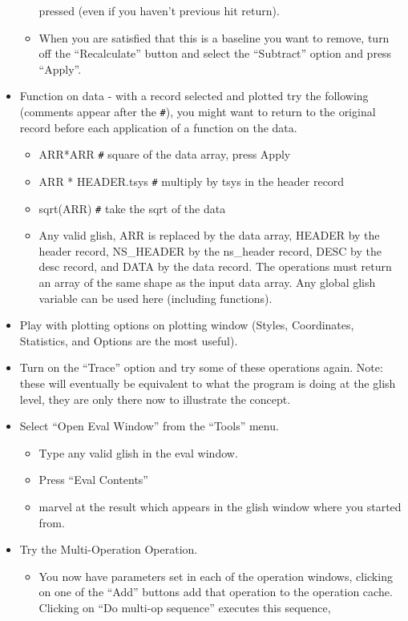\begin{itemize}
\begin{itemize}
pressed (even if you haven't previous hit return).
\item When you are satisfied that this is a baseline you want to remove,
turn off the ``Recalculate'' button and select the ``Subtract'' option
and press ``Apply''.
\end{itemize}
\item Function on data - with a record selected and plotted try the following
(comments appear after the \verb_#_), you might want to return to the original
record before each application of a function on the data.
\begin{itemize}
\item ARR*ARR  \verb_#_ square of the data array, press Apply
\item ARR * HEADER.tsys  \verb_#_ multiply by tsys in the header record
\item sqrt(ARR) \verb_#_ take the sqrt of the data
\item Any valid glish, ARR is replaced by the data array, HEADER by
the header record, NS\_HEADER by the ns\_header record, DESC by the 
desc record, and DATA by the data record.  The operations must return
an array of the same shape as the input data array.  Any global glish
variable can be used here (including functions).
\end{itemize}
\item Play with plotting options on plotting window (Styles, Coordinates,
Statistics, and Options are the most useful).
\item Turn on the ``Trace'' option and try some of these operations again.
Note: these will eventually be equivalent to what the program is doing
at the glish level, they are only there now to illustrate the concept.
\item Select ``Open Eval Window'' from the ``Tools'' menu.
\begin{itemize}
\item Type any valid glish in the eval window.
\item Press ``Eval Contents''
\item marvel at the result which appears in the glish window where you
started from.
\end{itemize}
\item Try the Multi-Operation Operation.
\begin{itemize}
\item You now have parameters set in each of the operation windows, clicking
on one of the ``Add'' buttons add that operation to the operation
cache.  Clicking on ``Do multi-op sequence'' executes this sequence,

\end{itemize}
\end{itemize}

